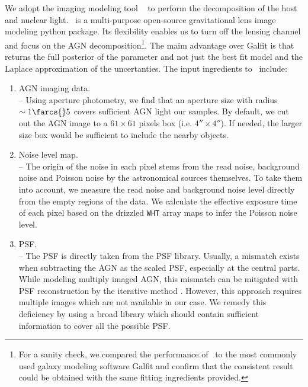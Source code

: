 \documentclass[apj]{emulateapj}
\begin{document}
We adopt the imaging modeling tool \lenstronomy\ \citep{lenstronomy} to perform the decomposition of the host and nuclear light. \lenstronomy\ is a multi-purpose open-source gravitational lens image modeling python package. 
Its flexibility enables us to turn off the lensing channel and focus on the AGN decomposition\footnote{For a sanity check, we compared the performance of \lenstronomy\ to the most commonly used galaxy modeling software {\sc Galfit} and confirm that the consistent result could be obtained with the same fitting ingredients provided.}. The maim advantage over {\sc Galfit} is that \lenstronomy returns the full posterior of the parameter and not just the best fit model and the Laplace approximation of the uncertanties. The input ingredients to \lenstronomy\ include:
\begin{enumerate}
\item AGN imaging data. \\
-- Using aperture photometry, we find that an aperture size with radius $\sim1\farcs{}5$ covers sufficient AGN light our samples. By default, we cut out the AGN image to a $61\times61$ pixels box (i.e. $4''\times 4''$). If needed, the larger size box would be sufficient to include the nearby objects. 
\item Noise level map.\\
-- The origin of the noise in each pixel stems from the read noise, background noise and Poisson noise by the astronomical sources themselves. To take them into account, we measure the read noise and background noise level directly from the empty regions of the data. We calculate the effective exposure time of each pixel based on the drizzled \texttt{WHT} array maps to infer the Poisson noise level. 
\item PSF. \\
-- 
The PSF is directly taken from the PSF library. Usually, a mismatch exists when subtracting the AGN as the scaled PSF, especially at the central parts. While modeling multiply imaged AGN, this mismatch can be mitigated with PSF reconstruction by the iterative method \citep{Chen2016, Birrer2018}.  However, this approach requires multiple images which are not available in our case.  We remedy this deficiency by using a broad library which should contain sufficient information to cover all the possible PSF. 
\end{enumerate}
\end{document}
